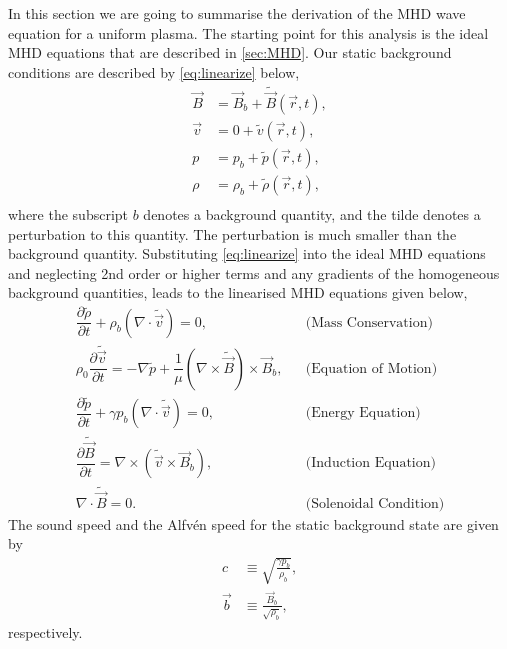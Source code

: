 In this section we are going to summarise the derivation of the MHD wave equation for a uniform plasma.
The starting point for this analysis is the ideal MHD equations that are described in \cref{sec:MHD}.
Our static background conditions are described by \cref{eq:linearize} below,
\begin{equation}\label{eq:linearize}
    \begin{aligned}                                                    
        \vec{B} &= \vec{B}_b + \tilde{\vec{B}}(\vec{r},t),\\
        \vec{v} &= 0 + \tilde{{v}}(\vec{r},t),\\
        p &= p_b + \tilde{p}(\vec{r},t),\\
        \rho &= \rho_b + {\tilde{\rho}}(\vec{r},t),\\
    \end{aligned}
\end{equation}
where the subscript $b$ denotes a background quantity, and the tilde denotes a perturbation to this quantity.
The perturbation is much smaller than the background quantity.
Substituting \cref{eq:linearize} into the ideal MHD equations and neglecting 2nd order or higher terms and any gradients of the homogeneous background quantities, leads to the linearised MHD equations given below,
\begin{align}                                                         
    \dfrac{\partial \tilde{\rho} }{\partial t} + \rho_b (\nabla \cdot \tilde{\vec{v}}) =       
    0,
    &&\text{(Mass Conservation)}\label{eq:lmhd_mass}\\
    \rho_0 \dfrac{\partial \tilde{\vec{v}}}{\partial t} =
    -\nabla \tilde{p} + \dfrac{1}{\mu}(\nabla \times \tilde{\vec{B}}) \times \vec{B}_b,
    &&\text{(Equation of Motion)}\label{eq:lmhd_motion}\\
    \dfrac{\partial \tilde{p}}{\partial t} + \gamma p_b \left( \nabla \cdot \tilde{\vec{v}} \right) = 0,
    &&\text{(Energy Equation)}\label{eq:lmhd_energy}\\
    \dfrac{\partial \tilde{\vec{B}}}{\partial t} = \nabla \times (\tilde{\vec{v}} \times \vec{B}_b),
    &&\text{(Induction Equation)}\label{eq:lmhd_induction}\\
    \nabla \cdot \tilde{\vec{B}} = 0.
    &&\text{(Solenoidal Condition)}\label{eq:lmhd_solenoid}              
\end{align}
The sound speed and the Alfv\'en speed for the static background state are given by 
\begin{align}
    c &\equiv \sqrt{\frac{\gamma p_b}{\rho_b}},\label{eq:soundspeed}\\
    \vec{b} &\equiv \frac{\vec{B}_b}{\sqrt{\rho_b}},\label{eq:alfvenspeed}
\end{align}
respectively.

